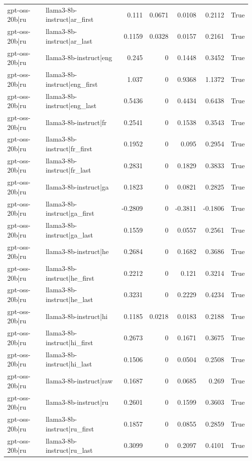 \begin{table}
\begin{tabular}{l l r r r r l}
gpt-oss-20b|ru & llama3-8b-instruct|ar_first & 0.111 & 0.0671 & 0.0108 & 0.2112 & True \\
gpt-oss-20b|ru & llama3-8b-instruct|ar_last & 0.1159 & 0.0328 & 0.0157 & 0.2161 & True \\
gpt-oss-20b|ru & llama3-8b-instruct|eng & 0.245 & 0 & 0.1448 & 0.3452 & True \\
gpt-oss-20b|ru & llama3-8b-instruct|eng_first & 1.037 & 0 & 0.9368 & 1.1372 & True \\
gpt-oss-20b|ru & llama3-8b-instruct|eng_last & 0.5436 & 0 & 0.4434 & 0.6438 & True \\
gpt-oss-20b|ru & llama3-8b-instruct|fr & 0.2541 & 0 & 0.1538 & 0.3543 & True \\
gpt-oss-20b|ru & llama3-8b-instruct|fr_first & 0.1952 & 0 & 0.095 & 0.2954 & True \\
gpt-oss-20b|ru & llama3-8b-instruct|fr_last & 0.2831 & 0 & 0.1829 & 0.3833 & True \\
gpt-oss-20b|ru & llama3-8b-instruct|ga & 0.1823 & 0 & 0.0821 & 0.2825 & True \\
gpt-oss-20b|ru & llama3-8b-instruct|ga_first & -0.2809 & 0 & -0.3811 & -0.1806 & True \\
gpt-oss-20b|ru & llama3-8b-instruct|ga_last & 0.1559 & 0 & 0.0557 & 0.2561 & True \\
gpt-oss-20b|ru & llama3-8b-instruct|he & 0.2684 & 0 & 0.1682 & 0.3686 & True \\
gpt-oss-20b|ru & llama3-8b-instruct|he_first & 0.2212 & 0 & 0.121 & 0.3214 & True \\
gpt-oss-20b|ru & llama3-8b-instruct|he_last & 0.3231 & 0 & 0.2229 & 0.4234 & True \\
gpt-oss-20b|ru & llama3-8b-instruct|hi & 0.1185 & 0.0218 & 0.0183 & 0.2188 & True \\
gpt-oss-20b|ru & llama3-8b-instruct|hi_first & 0.2673 & 0 & 0.1671 & 0.3675 & True \\
gpt-oss-20b|ru & llama3-8b-instruct|hi_last & 0.1506 & 0 & 0.0504 & 0.2508 & True \\
gpt-oss-20b|ru & llama3-8b-instruct|raw & 0.1687 & 0 & 0.0685 & 0.269 & True \\
gpt-oss-20b|ru & llama3-8b-instruct|ru & 0.2601 & 0 & 0.1599 & 0.3603 & True \\
gpt-oss-20b|ru & llama3-8b-instruct|ru_first & 0.1857 & 0 & 0.0855 & 0.2859 & True \\
gpt-oss-20b|ru & llama3-8b-instruct|ru_last & 0.3099 & 0 & 0.2097 & 0.4101 & True \\

\end{tabular}
\end{table}
